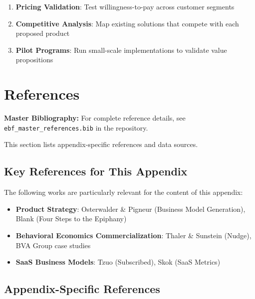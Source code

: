 \begin{enumerate}
    \item \textbf{Pricing Validation}: Test willingness-to-pay across customer segments
    \item \textbf{Competitive Analysis}: Map existing solutions that compete with each proposed product
    \item \textbf{Pilot Programs}: Run small-scale implementations to validate value propositions
\end{enumerate}


\section{References}
\label{sec:vvv3-references}

\begin{tcolorbox}[colback=blue!5!white, colframe=blue!75!black]
\textbf{Master Bibliography:} For complete reference details, see
\texttt{ebf\_master\_references.bib} in the repository.

This section lists appendix-specific references and data sources.
\end{tcolorbox}

\vspace{0.5em}

\subsection{Key References for This Appendix}

The following works are particularly relevant for the content of this appendix:

\begin{itemize}[nosep]
    \item \textbf{Product Strategy}: Osterwalder \& Pigneur (Business Model Generation), Blank (Four Steps to the Epiphany)
    \item \textbf{Behavioral Economics Commercialization}: Thaler \& Sunstein (Nudge), BVA Group case studies
    \item \textbf{SaaS Business Models}: Tzuo (Subscribed), Skok (SaaS Metrics)
\end{itemize}

\subsection{Appendix-Specific References}


